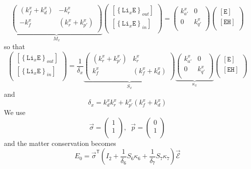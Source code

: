 \documentclass[aps,onecolumn,11pt]{revtex4}
\newcommand{\mychem}[1]{\mathtt{#1}}
\newcommand{\myconc}[1]{\left\lbrack{#1}\right\rbrack}
\newcommand{\LiEin}[1]{\myconc{\left\lbrace\mychem{Li}_{#1}\mychem{E}\right\rbrace_{in}}}
\newcommand{\LiEout}[1]{\myconc{\left\lbrace\mychem{Li}_{#1}\mychem{E}\right\rbrace_{out}}}
\newcommand{\EHin}{\myconc{\mychem{EH}}}
\newcommand{\Eout}{\myconc{\mychem{E}}}
\newcommand{\mytrn}[1]{{#1}^{\mathsf{T}}}
\begin{document}
\begin{equation}
\underbrace{
\begin{pmatrix}
	\left(k_f^x+k_d^x\right) & -k_r^x\\
	-k_f^x & \left(k_r^x+k_{p'}^x\right)\\
\end{pmatrix}
}_{M_x}
\begin{pmatrix}
	\LiEout{x}\\
	\LiEin{x}\\
\end{pmatrix}
=
	\begin{pmatrix}
	k_{a'}^x & 0 \\
	0     & k_{q'}^x \\
	\end{pmatrix}
	\begin{pmatrix}
	\Eout\\
	\EHin\\
	\end{pmatrix}
\end{equation}
so that
\begin{equation}
	\begin{pmatrix}
	\LiEout{x}\\
	\LiEin{x}\\
\end{pmatrix}
= \dfrac{1}{\delta_x} 
\underbrace{
\begin{pmatrix}
	\left(k_r^x+k_{p'}^x\right) & k_r^x\\
	k_f^x & \left(k_f^x+k_d^x\right)\\
\end{pmatrix}}_{S_x}
\underbrace{
\begin{pmatrix}
	k_{a'}^x & 0 \\
	0     & k_{q'}^x \\
	\end{pmatrix}
		}_{\kappa_x}
	\begin{pmatrix}
	\Eout\\
	\EHin\\
	\end{pmatrix}
\end{equation}
and
\begin{equation}
\delta_x = k_d^x k_r^x + k_{p'}^x\left(k_f^x+k_d^x\right) 
\end{equation}
We use 
\begin{equation}
	\vec{\sigma} = 
	\begin{pmatrix}
	1\\
	1\\
	\end{pmatrix}, \;\; 
	\vec{p} = 
	\begin{pmatrix}
	0\\
	1\\
	\end{pmatrix}
\end{equation}
and the matter conservation becomes
\begin{equation}
	E_0 = \mytrn{\vec{\sigma}}\left(I_2+\dfrac{1}{\delta_6}S_6\kappa_6+\dfrac{1}{\delta_7}S_7\kappa_7\right) \vec{\mathcal{E}}
\end{equation}
\end{document}
